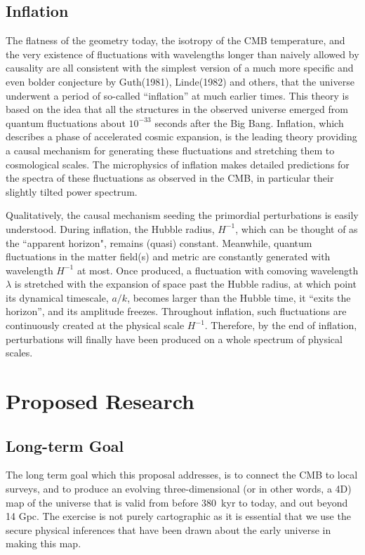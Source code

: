 \documentclass[psfig,11pt]{article}
\begin{document}
\subsection{Inflation}

The flatness of the geometry today, the isotropy of the CMB temperature, and the very existence of fluctuations with wavelengths longer than naively allowed by causality are all consistent with the simplest version of a much more specific and even bolder conjecture by Guth(1981), Linde(1982) and others, that the universe underwent a period of so-called ``inflation'' at much earlier times. This theory is based on the idea that all the structures in the observed universe emerged from quantum fluctuations about $10^{-33}$ seconds after the Big Bang. Inflation, which describes a phase of accelerated cosmic expansion, is the leading theory providing a causal mechanism for generating these fluctuations and stretching them to cosmological scales. The microphysics of inflation makes detailed predictions for the spectra of these fluctuations as observed in the CMB, in particular their slightly tilted power spectrum.

Qualitatively, the causal mechanism seeding the primordial perturbations is easily understood. During inflation, the Hubble radius, $H^{-1}$, which can be thought of as the ``apparent horizon", remains (quasi) constant. Meanwhile, quantum fluctuations in the matter field(s) and metric are constantly generated with wavelength $H ^{-1}$ at most. Once produced, a fluctuation with comoving wavelength $\lambda$ is stretched with the expansion of space past the Hubble radius, at which point its dynamical timescale, $a/k$, becomes larger than the Hubble time, it ``exits the horizon'', and its amplitude freezes.  Throughout inflation, such fluctuations are continuously created at the physical scale $H^{-1}$. Therefore, by the end of inflation, perturbations will finally have been produced on a whole spectrum of physical scales.




\section{Proposed Research}

\subsection{Long-term Goal}

The long term goal which this proposal addresses, is to connect the CMB to local surveys, and to produce an evolving three-dimensional (or in other words, a 4D) map of the universe that is valid from before 380~kyr to today, and out beyond 14 Gpc. The exercise is not purely cartographic as it is essential that we use the secure physical inferences that have been drawn about the early universe in making this map.
\end{document}

